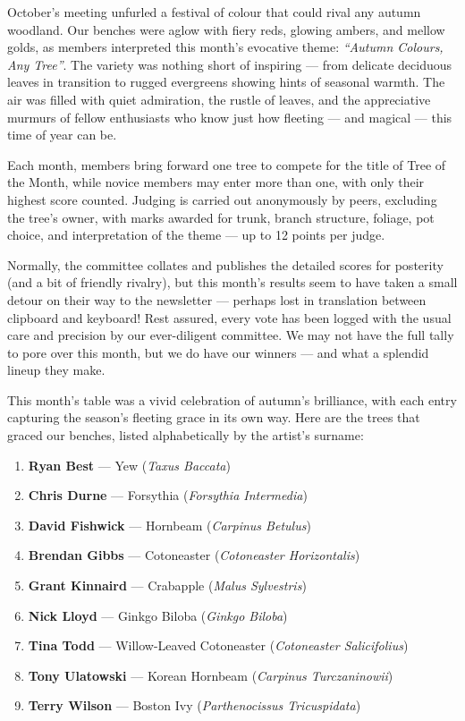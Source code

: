 \label{2025-10-contest}
\noindent
October's meeting unfurled a festival of colour that could rival any autumn woodland.
Our benches were aglow with fiery reds, glowing ambers, and mellow golds, as members interpreted this month's evocative theme: \textit{``Autumn Colours, Any Tree''}.
The variety was nothing short of inspiring --- from delicate deciduous leaves in transition to rugged evergreens showing hints of seasonal warmth.
The air was filled with quiet admiration, the rustle of leaves, and the appreciative murmurs of fellow enthusiasts who know just how fleeting --- and magical --- this time of year can be.

Each month, members bring forward one tree to compete for the title of Tree of the Month, while novice members may enter more than one, with only their highest score counted.
Judging is carried out anonymously by peers, excluding the tree's owner, with marks awarded for trunk, branch structure, foliage, pot choice, and interpretation of the theme --- up to 12 points per judge.

Normally, the committee collates and publishes the detailed scores for posterity (and a bit of friendly rivalry), but this month's results seem to have taken a small detour on their way to the newsletter --- perhaps lost in translation between clipboard and keyboard!
Rest assured, every vote has been logged with the usual care and precision by our ever\--diligent committee.
We may not have the full tally to pore over this month, but we do have our winners --- and what a splendid lineup they make.

\medskip
{}
\noindent
This month's table was a vivid celebration of autumn's brilliance, with each entry capturing the season's fleeting grace in its own way.
Here are the trees that graced our benches, listed alphabetically by the artist's surname:

\begin{enumerate}
    \item \textbf{Ryan Best} --- Yew (\textit{Taxus Baccata})
    \item \textbf{Chris Durne} --- Forsythia (\textit{Forsythia Intermedia})
    \item \textbf{David Fishwick} --- Hornbeam (\textit{Carpinus Betulus})
    \item \textbf{Brendan Gibbs} --- Cotoneaster (\textit{Cotoneaster Horizontalis})
    \item \textbf{Grant Kinnaird} --- Crabapple (\textit{Malus Sylvestris})
    \item \textbf{Nick Lloyd} --- Ginkgo Biloba (\textit{Ginkgo Biloba})
    \item \textbf{Tina Todd} --- Willow\--Leaved Cotoneaster (\textit{Cotoneaster Salicifolius})
    \item \textbf{Tony Ulatowski} --- Korean Hornbeam (\textit{Carpinus Turczaninowii})
    \item \textbf{Terry Wilson} --- Boston Ivy (\textit{Parthenocissus Tricuspidata})
\end{enumerate}

